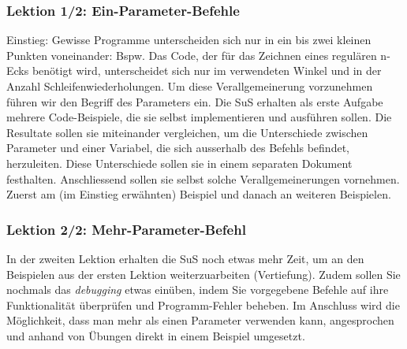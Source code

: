 \begin{myExBox}[title=DL \themycounter]
\subsubsection*{Lektion 1/2: Ein-Parameter-Befehle}
Einstieg: Gewisse Programme unterscheiden sich nur in ein bis zwei kleinen Punkten voneinander: Bspw. Das Code, der für das Zeichnen eines regulären n-Ecks benötigt wird, unterscheidet sich nur im verwendeten Winkel und in der Anzahl Schleifenwiederholungen. Um diese Verallgemeinerung vorzunehmen führen wir den Begriff des Parameters ein. Die SuS erhalten als erste Aufgabe mehrere Code-Beispiele, die sie selbst implementieren und ausführen sollen. Die Resultate sollen sie miteinander vergleichen, um die Unterschiede zwischen Parameter und einer Variabel, die sich ausserhalb des Befehls befindet, herzuleiten. Diese Unterschiede sollen sie in einem separaten Dokument festhalten. Anschliessend sollen sie selbst solche Verallgemeinerungen vornehmen. Zuerst am (im Einstieg erwähnten) Beispiel und danach an weiteren Beispielen.

\subsubsection*{Lektion 2/2: Mehr-Parameter-Befehl}
In der zweiten Lektion erhalten die SuS noch etwas mehr Zeit, um an den Beispielen aus der ersten Lektion weiterzuarbeiten (Vertiefung). Zudem sollen Sie nochmals das \textit{debugging} etwas einüben, indem Sie vorgegebene Befehle auf ihre Funktionalität überprüfen und Programm-Fehler beheben. Im Anschluss wird die Möglichkeit, dass man mehr als einen Parameter verwenden kann, angesprochen und anhand von Übungen direkt in einem Beispiel umgesetzt.


\end{myExBox}
